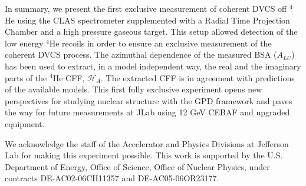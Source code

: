 \documentclass[twocolumn,nofootinbib,showpacs,prl,superscriptaddress,secnumarabic,amssymb,nobibnotes,aps,floatfix]{revtex4}
\begin{document}
In summary, we present the first exclusive measurement of coherent DVCS off 
$^4$He using the CLAS spectrometer supplemented with a Radial Time Projection 
Chamber and a high pressure gaseous target. This setup allowed detection of the 
low energy $^4$He recoils in order to ensure an exclusive measurement of the
coherent DVCS process.
The azimuthal dependence of the measured BSA ($A_{LU}$) has 
been used to extract, in a model independent way, the real and the imaginary 
parts of the $^4$He CFF, $\mathcal{H}_A$. The extracted CFF is in  
agreement with predictions of the available models. This first fully exclusive 
experiment opens new perspectives for studying nuclear structure with the GPD 
framework and paves the way for future measurements at JLab using 12 GeV CEBAF 
and upgraded equipment.


We acknowledge the staff of the Accelerator and Physics Divisions at Jefferson 
Lab for making this experiment possible. This work is supported by the U.S.  
Department of Energy, Office of Science, Office of Nuclear Physics, under 
contracts DE-AC02-06CH11357 and DE-AC05-06OR23177.
\end{document}
